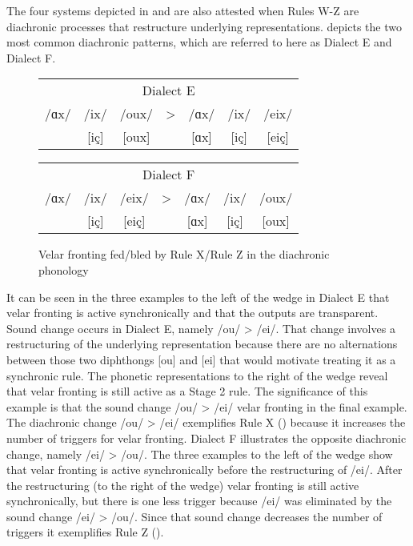 \begin{xlist}
\begin{xlist}
The four systems depicted in  and  are also attested when Rules W-Z are diachronic processes that restructure underlying representations.  depicts the two most common diachronic patterns, which are referred to here as Dialect E and Dialect F.

\begin{figure}
\begin{minipage}[b]{.5\linewidth}
  \centering
  \tabcolsep=3pt
  \begin{tabular}{ *{7}{c} }
  \multicolumn{7}{c}{Dialect E}\\\cmidrule(lr){1-7}
   /ɑx/  & /ix/ &  /oux/ & > & /ɑx/  & /ix/ &  /eix/\\\relax
   [ɑx]  & [iç] & [oux]  &   & [ɑx]  & [iç] &  [eiç]\\   
  \end{tabular}
\end{minipage}%
\begin{minipage}[b]{.5\linewidth}
    \centering
    \tabcolsep=3pt
     \begin{tabular}{ *{7}{c} }                               
         \multicolumn{7}{c}{Dialect F}\\\cmidrule(lr){1-7}
         /ɑx/ &  /ix/&  /eix/ &   > & /ɑx/  & /ix/  & /oux/\\\relax
         [ɑx] & [iç] & [eiç]  &     & [ɑx]  & [iç]  & [oux]\\
     \end{tabular}
\end{minipage}
\caption{\label{fig:2.8}Velar fronting fed/bled by Rule X/Rule Z in the diachronic phonology}
\end{figure}

It can be seen in the three examples to the left of the wedge in Dialect E that velar fronting is active synchronically and that the outputs are transparent. Sound change occurs in Dialect E, namely /ou/ > /ei/. That change involves a restructuring of the underlying representation because there are no alternations between those two diphthongs [ou] and [ei] that would motivate treating it as a synchronic rule. The phonetic representations to the right of the wedge reveal that velar fronting is still active as a Stage 2 rule. The significance of this example is that the sound change /ou/ > /ei/  velar fronting in the final example. The diachronic change /ou/ > /ei/ exemplifies Rule X () because it increases the number of triggers for velar fronting. Dialect F illustrates the opposite diachronic change, namely /ei/ > /ou/. The three examples to the left of the wedge show that velar fronting is active synchronically before the restructuring of /ei/. After the restructuring (to the right of the wedge) velar fronting is still active synchronically, but there is one less trigger because /ei/ was eliminated by the sound change /ei/ > /ou/. Since that sound change decreases the number of triggers it exemplifies Rule Z ().


\end{xlist}
\end{xlist}
